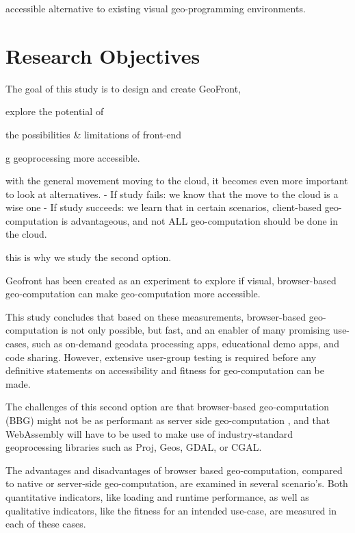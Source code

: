 accessible alternative to existing visual geo-programming environments.

\section{Research Objectives}


The goal of this study is to design and create GeoFront, 

explore the potential of 

the possibilities \& limitations of front-end 





g geoprocessing more accessible.


with the general movement moving to the cloud, it becomes even more important to look at alternatives. 
- If study fails: we know that the move to the cloud is a wise one
- If study succeeds: we learn that in certain scenarios, client-based geo-computation is advantageous, and not ALL geo-computation should be done in the cloud.

this is why we study the second option. 


Geofront has been created as an experiment to explore if visual, browser-based geo-computation can make geo-computation more accessible. 


This study concludes that based on these measurements, browser-based geo-computation is not only possible, but fast, and an enabler of many promising use-cases, such as on-demand geodata processing apps, educational demo apps, and code sharing. However, extensive user-group testing is required before any definitive statements on accessibility and fitness for geo-computation can be made.  





The challenges of this second option are that browser-based geo-computation (BBG) might not be as performant as server side geo-computation \cite{panidi_hybrid_2015, hamilton_client-side_2014}, and that WebAssembly will have to be used to make use of industry-standard geoprocessing libraries such as Proj, Geos, GDAL, or CGAL.


The advantages and disadvantages of browser based geo-computation, compared to native or server-side geo-computation, are examined in several scenario's. 
Both quantitative indicators, like loading and runtime performance, as well as qualitative indicators, like the fitness for an intended use-case, are measured in each of these cases.

